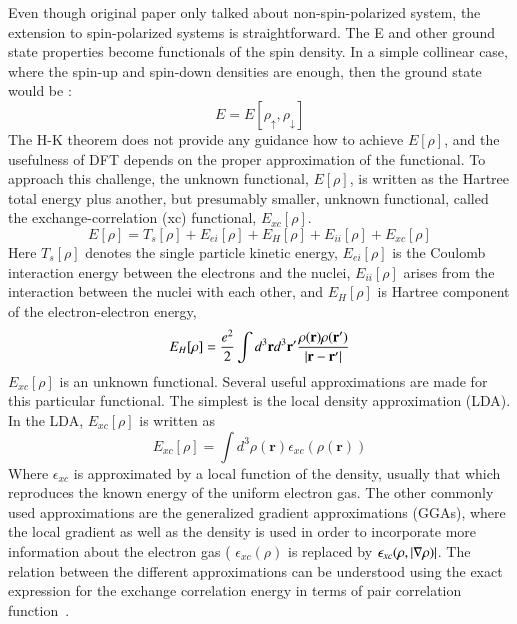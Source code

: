Even though original paper only talked about non-spin-polarized system, the extension to spin-polarized systems is straightforward. The E and other ground state properties become functionals of the spin density. In a simple collinear case, where the spin-up and spin-down densities are enough, then the ground state would be :
\begin{equation}
	E =E[\rho_{\uparrow},\rho_{\downarrow}]
\end{equation} 
The H-K theorem does not provide any guidance how to achieve $E[\rho]$, and the usefulness of DFT depends on the proper approximation of the functional. To approach this challenge, the unknown functional, $E[\rho]$, is written as the Hartree total energy plus another, but presumably smaller, unknown functional, called the exchange-correlation (xc) functional, $E_{xc}[\rho]$.
\begin{equation}
\label{eq_main_func}
E[\rho] = T_s[\rho] + E_{ei} [\rho] + E_H[\rho] + E_{ii}[\rho] + E_{xc}[\rho]
\end{equation}
Here $T_s[\rho]$ denotes the single particle kinetic energy, $E_{ei}[\rho]$ is the Coulomb interaction energy between the electrons and the nuclei, $E_{ii}[\rho]$ arises from the interaction between the nuclei with each other, and $E_H[\rho]$ is Hartree component of the electron-electron energy,
\begin{equation}
\label{eq_hartree}
E_H[\rho] = \frac{e^2}{2}\int d^3\mathbf{r}d^3\mathbf{r'} \frac{\rho(\mathbf{r})\rho(\mathbf{r'})}{\abs{\mathbf{r}-\mathbf{r'}}}
\end{equation}
$E_{xc}[\rho]$ is an unknown functional. Several useful approximations are made for this particular functional. The simplest is the local density approximation (LDA). In the LDA, $E_{xc}[\rho]$ is written as
\begin{equation}
E_{xc}[\rho] = \int d^3\rho(\mathbf{r})\epsilon_{xc}(\rho(\mathbf{r}))
\end{equation}
Where $\epsilon_{xc}$ is approximated by a local function of the density, usually that which reproduces the known energy of the uniform electron gas. The other commonly used approximations are the generalized gradient approximations (GGAs), where the local gradient as well as the density is used in order to incorporate more information about the electron gas ( $\epsilon_{xc} (\rho)$ is replaced by $\epsilon_{xc}(\rho,\abs{\nabla\rho)}$. The relation between the different approximations can be understood using the exact expression for the exchange correlation energy in terms of pair correlation function~\cite{langreth1975exchange}.

